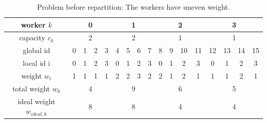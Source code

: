 \begin{table}[H]
	\begin{center}
		\begin{tabular}{ | c | c | c | c | c | c | c | c | c | c | c | c | c | c | c | c | c | } 
			\hline
			worker \(k\) & \multicolumn{4}{c|}{\cellcolor{vs_lightgreen}0} & \multicolumn{4}{c|}{\cellcolor{vs_lightblue}1} & \multicolumn{4}{c|}{\cellcolor{vs_lightred}2} & \multicolumn{4}{c|}{\cellcolor{vs_lightplum}3}  \\
			\hline
			capacity \(c_k\) & \multicolumn{4}{c|}{\cellcolor{vs_lightgreen}2} & \multicolumn{4}{c|}{\cellcolor{vs_lightblue}2} & \multicolumn{4}{c|}{\cellcolor{vs_lightred}1} & \multicolumn{4}{c|}{\cellcolor{vs_lightplum}1}  \\
			\hline
			global id & \cellcolor{vs_lightgreen}0 & \cellcolor{vs_lightgreen}1 & \cellcolor{vs_lightgreen}2 & \cellcolor{vs_lightgreen}3 & \cellcolor{vs_lightblue}4 & \cellcolor{vs_lightblue}5 & \cellcolor{vs_lightblue}6 & \cellcolor{vs_lightblue}7 & \cellcolor{vs_lightred}8 & \cellcolor{vs_lightred}9 & \cellcolor{vs_lightred}10 & \cellcolor{vs_lightred}11 & \cellcolor{vs_lightplum}12 & \cellcolor{vs_lightplum}13 & \cellcolor{vs_lightplum}14 & \cellcolor{vs_lightplum}15 \\ 
			\hline
			local id i & \cellcolor{vs_lightgreen}0 & \cellcolor{vs_lightgreen}1 & \cellcolor{vs_lightgreen}2 & \cellcolor{vs_lightgreen}3 & \cellcolor{vs_lightblue}0 & \cellcolor{vs_lightblue}1 & \cellcolor{vs_lightblue}2 & \cellcolor{vs_lightblue}3 & \cellcolor{vs_lightred}0 & \cellcolor{vs_lightred}1 & \cellcolor{vs_lightred}2 & \cellcolor{vs_lightred}3 & \cellcolor{vs_lightplum}0 & \cellcolor{vs_lightplum}1 & \cellcolor{vs_lightplum}2 & \cellcolor{vs_lightplum}3 \\ 
			\hline
			weight \(w_i\) & \cellcolor{vs_lightgreen}1 & \cellcolor{vs_lightgreen}1 & \cellcolor{vs_lightgreen}1 & \cellcolor{vs_lightgreen}1 & \cellcolor{vs_lightblue}2 & \cellcolor{vs_lightblue}2 & \cellcolor{vs_lightblue}3 & \cellcolor{vs_lightblue}2 & \cellcolor{vs_lightred}2 & \cellcolor{vs_lightred}1 & \cellcolor{vs_lightred}2 & \cellcolor{vs_lightred}1 & \cellcolor{vs_lightplum}1 & \cellcolor{vs_lightplum}1 & \cellcolor{vs_lightplum}2 & \cellcolor{vs_lightplum}1 \\ 
			\hline
			total weight \(w_k\) & \multicolumn{4}{c|}{\cellcolor{vs_lightgreen}4} & \multicolumn{4}{c|}{\cellcolor{vs_lightblue}9} & \multicolumn{4}{c|}{\cellcolor{vs_lightred}6} & \multicolumn{4}{c|}{\cellcolor{vs_lightplum}5} \\ 
			\hline
			ideal weight \(w_{ideal,k}\) & \multicolumn{4}{c|}{\cellcolor{vs_lightgreen}8} & \multicolumn{4}{c|}{\cellcolor{vs_lightblue}8} & \multicolumn{4}{c|}{\cellcolor{vs_lightred}4} & \multicolumn{4}{c|}{\cellcolor{vs_lightplum}4} \\ 
			\hline
		\end{tabular}
	
		\caption{Problem before repartition: The workers have uneven weight.}\label{table:before_repartition}
	\end{center}
\end{table}

